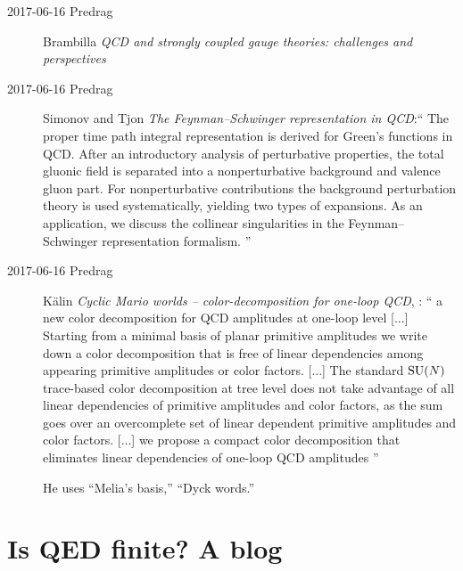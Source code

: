 \begin{description}
\item[2017-06-16 Predrag]
Brambilla \etal{}
{\em {QCD} and strongly coupled gauge theories: challenges and perspectives}

\item[2017-06-16 Predrag]
Simonov and Tjon
{\em The {Feynman–Schwinger} representation in {QCD}}:``
The proper time path integral representation is derived for Green's
functions in QCD. After an introductory analysis of perturbative
properties, the total gluonic field is separated into a nonperturbative
background and valence gluon part. For nonperturbative contributions the
background perturbation theory is used systematically, yielding two types
of expansions. As an application, we discuss the collinear singularities
in the Feynman–Schwinger representation formalism.
''

\item[2017-06-16 Predrag]
K{\"a}lin
{\em Cyclic {Mario} worlds -- color-decomposition for one-loop {QCD}},
: ``
a new color decomposition for QCD amplitudes at one-loop level [...] Starting
from a minimal basis of planar primitive amplitudes we write down a color
decomposition that is free of linear dependencies among appearing primitive
amplitudes or color factors. [...] The  standard  $\textrm{SU}(N)$ trace-based  color
decomposition at  tree  level  does  not take advantage of all linear
dependencies of primitive amplitudes and color factors, as the sum  goes  over
an  overcomplete  set  of  linear  dependent  primitive  amplitudes  and  color
factors. [...] we  propose  a  compact  color  decomposition that eliminates
linear dependencies of one-loop QCD amplitudes
''

He uses ``Melia's basis,'' ``Dyck words.''

\end{description}

\newpage
\section{Is QED finite? A blog}
\label{sect:finiteBlog}

